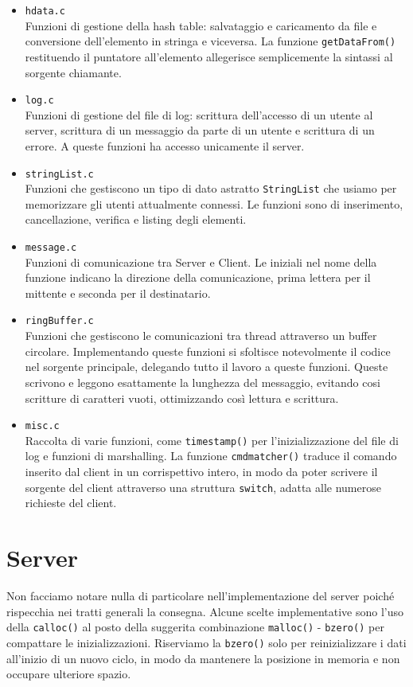 \documentclass[a4paper, 11pt]{article} %
\begin{document}
\begin{itemize}
	\item \texttt{hdata.c}\\
	Funzioni di gestione della hash table: salvataggio e caricamento da file e conversione dell'elemento in stringa e viceversa. La funzione \texttt{getDataFrom()} restituendo il puntatore all'elemento allegerisce semplicemente la sintassi al sorgente chiamante.
	\item  \texttt{log.c}\\
	Funzioni di gestione del file di log: scrittura dell'accesso di un utente al server, scrittura di un messaggio da parte di un utente e scrittura di un errore. A queste funzioni ha accesso unicamente il server.
	\item  \texttt{stringList.c}\\
	Funzioni che gestiscono un tipo di dato astratto \texttt{StringList} che usiamo per memorizzare gli utenti attualmente connessi. Le funzioni sono di inserimento, cancellazione, verifica e listing degli elementi.
	\item  \texttt{message.c}\\
	Funzioni di comunicazione tra Server e Client. Le iniziali nel nome della funzione indicano la direzione della comunicazione, prima lettera per il mittente e seconda per il destinatario.
	\item  \texttt{ringBuffer.c}\\
	Funzioni che gestiscono le comunicazioni tra thread attraverso un buffer circolare. Implementando queste funzioni si sfoltisce notevolmente il codice nel sorgente principale, delegando tutto il lavoro a queste funzioni. Queste scrivono e leggono esattamente la lunghezza del messaggio, evitando cosi scritture di caratteri vuoti, ottimizzando così lettura e scrittura. 
	\item  \texttt{misc.c}\\
	Raccolta di varie funzioni, come \texttt{timestamp()} per l'inizializzazione del file di log e funzioni di marshalling. La funzione \texttt{cmdmatcher()} traduce il comando inserito dal client in un corrispettivo intero, in modo da poter scrivere il sorgente del client attraverso una struttura \texttt{switch}, adatta alle numerose richieste del client.
\end{itemize}

\section*{Server}
Non facciamo notare nulla di particolare nell'implementazione del server poiché rispecchia nei tratti generali la consegna. Alcune scelte implementative sono l'uso della \texttt{calloc()} al posto della suggerita combinazione \texttt{malloc()} - \texttt{bzero()} per compattare le inizializzazioni. Riserviamo la \texttt{bzero()} solo per reinizializzare i dati all'inizio di un nuovo ciclo, in modo da mantenere la posizione in memoria e non occupare ulteriore spazio.
\end{document}
